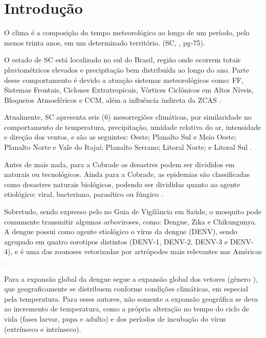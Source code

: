 \chapter{Introdução}

\indent O clima é a composição do tempo meteorológico ao longo de um período, pelo menos trinta anos, em um determinado território. (\acrlong{SC}, \citeyear{AtlasSCnatureza}, pg-75).

\indent O estado de \acrfull{SC} está localizado no sul do Brasil, região onde ocorrem totais pluviométricos elevados e precipitação bem distribuída ao longo do ano. Parte desse comportamento é devido a atuação sistemas meteorológicos como: \acrfull{FF}, Sistemas Frontais, Ciclones Extratropicais, Vórtices Ciclônicos em Altos Níveis, Bloqueios Atmosféricos e \acrfull{CCM}, além a influência indireta da \acrfull{ZCAS} \cite{reboita2010}.

\indent Atualmente, \acrlong{SC} apresenta seis (6) mesorregiões climáticas, por similaridade no comportamento de temperatura, precipitação, umidade relativa do ar, intensidade e direção dos ventos, e são as seguintes: Oeste; Planalto Sul e Meio Oeste; Planalto Norte e Vale do Itajaí; Planalto Serrano; Litoral Norte; e Litoral Sul \cite{Guerra2023Regionalizacao}.

\indent Antes de mais nada, para a \acrfull{Cobrade} os desastres podem ser divididos em naturais ou tecnológicos. Ainda para a \acrshort{Cobrade}, as epidemias são classificadas como desastres naturais biológicos, podendo ser divididas quanto ao agente etiológico: viral, bacteriano, parasítico ou fúngico \cite{GIRD}.

\indent Sobretudo, sendo expresso pelo  no Guia de Vigilância em Saúde, o mosquito  pode comumente transmitir algumas arboviroses, como: Dengue, Zika e Chikungunya. A dengue possui como agente etiológico o vírus da dengue (\acrfull{DENV}), sendo agrupado em quatro sorotipos distintos (\acrshort{DENV}-1, \acrshort{DENV}-2, \acrshort{DENV}-3 e \acrshort{DENV}-4), e é uma das zoonoses vetorizadas por artrópodes mais relevantes nas Américas \cite{GuiaVigSaúde22}.

\indent Para  a expansão global da dengue segue a expansão global dos vetores (gênero ), que geograficamente se distribuem conforme condições climáticas, em especial pela temperatura. Para esses autores, não somente a expansão geográfica se deva ao incremento de temperatura, como a própria alteração no tempo do ciclo de vida (fases larvar, pupa e adulto) e dos períodos de incubação do vírus (extrínseco e intrínseco).


